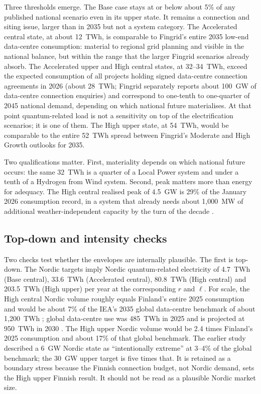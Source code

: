 \documentclass[11pt,a4paper]{article}
\begin{document}
Three thresholds emerge. The Base case stays at or below about 5\% of any published national scenario even in its upper state. It remains a connection and siting issue, larger than in 2035 but not a system category. The Accelerated central state, at about 12~TWh, is comparable to Fingrid's entire 2035 low-end data-centre consumption: material to regional grid planning and visible in the national balance, but within the range that the larger Fingrid scenarios already absorb. The Accelerated upper and High central states, at 32--34~TWh, exceed the expected consumption of all projects holding signed data-centre connection agreements in 2026 (about 28~TWh; Fingrid separately reports about 100~GW of data-centre connection enquiries) and correspond to one-tenth to one-quarter of 2045 national demand, depending on which national future materialises. At that point quantum-related load is not a sensitivity on top of the electrification scenarios; it is one of them. The High upper state, at 54~TWh, would be comparable to the entire 52~TWh spread between Fingrid's Moderate and High Growth outlooks for 2035.

Two qualifications matter. First, materiality depends on which national future occurs: the same 32~TWh is a quarter of a Local Power system and under a tenth of a Hydrogen from Wind system. Second, peak matters more than energy for adequacy. The High central realised peak of 4.5~GW is 29\% of the January 2026 consumption record, in a system that already needs about 1,000~MW of additional weather-independent capacity by the turn of the decade \citep{fingrid2026q3}.

\subsection{Top-down and intensity checks}\label{sec:intensity}
Two checks test whether the envelopes are internally plausible. The first is top-down. The Nordic targets imply Nordic quantum-related electricity of 4.7~TWh (Base central), 33.6~TWh (Accelerated central), 80.8~TWh (High central) and 203.5~TWh (High upper) per year at the corresponding $r$ and $\ell$. For scale, the High central Nordic volume roughly equals Finland's entire 2025 consumption and would be about 7\% of the IEA's 2035 global data-centre benchmark of about 1,200~TWh \citep{iea2025energyai}; global data-centre use was 485~TWh in 2025 and is projected at 950~TWh in 2030 \citep{iea2026keyquestions}. The High upper Nordic volume would be 2.4 times Finland's 2025 consumption and about 17\% of that global benchmark. The earlier study described a 6~GW Nordic state as ``intentionally extreme'' at 3--4\% of the global benchmark; the 30~GW upper target is five times that. It is retained as a boundary stress because the Finnish connection budget, not Nordic demand, sets the High upper Finnish result. It should not be read as a plausible Nordic market size.
\end{document}
